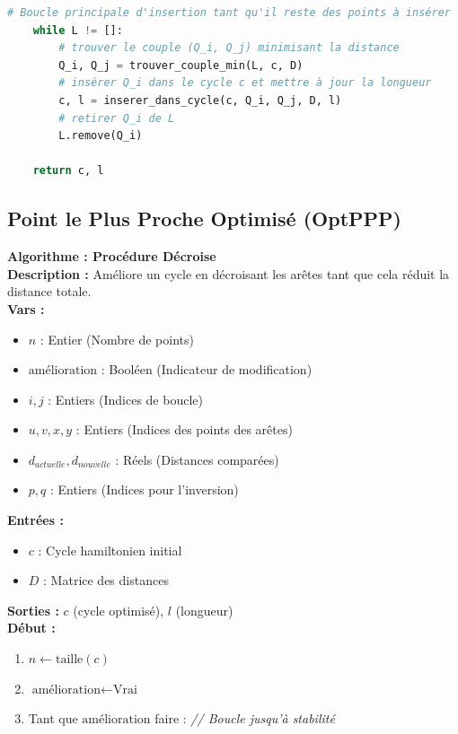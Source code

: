 \documentclass[a4paper, 12pt]{article}
\begin{document}
\begin{lstlisting}[language=Python, caption=Implémentation de PPP]
    # Boucle principale d'insertion tant qu'il reste des points à insérer
    while L != []:
        # trouver le couple (Q_i, Q_j) minimisant la distance
        Q_i, Q_j = trouver_couple_min(L, c, D)
        # insérer Q_i dans le cycle c et mettre à jour la longueur
        c, l = inserer_dans_cycle(c, Q_i, Q_j, D, l)
        # retirer Q_i de L
        L.remove(Q_i)

    return c, l
\end{lstlisting}

\subsection{Point le Plus Proche Optimisé (OptPPP)}

\begin{tcolorbox}[colback=darkWhite!75!white,colframe=black!30,left=5pt,right=5pt,top=5pt,bottom=5pt]
\textbf{Algorithme : Procédure Décroise} \\
\textbf{Description :} Améliore un cycle en décroisant les arêtes tant que cela réduit la distance totale. \\
\textbf{Vars :}
\begin{itemize}
    \item $n$ : Entier (Nombre de points)
    \item $\text{amélioration}$ : Booléen (Indicateur de modification)
    \item $i, j$ : Entiers (Indices de boucle)
    \item $u, v, x, y$ : Entiers (Indices des points des arêtes)
    \item $d_{actuelle}, d_{nouvelle}$ : Réels (Distances comparées)
    \item $p, q$ : Entiers (Indices pour l'inversion)
\end{itemize}
\textbf{Entrées :}
\begin{itemize}
    \item $c$ : Cycle hamiltonien initial
    \item $D$ : Matrice des distances
\end{itemize}
\textbf{Sorties :} $c$ (cycle optimisé), $l$ (longueur) \\
\textbf{Début :}
\begin{enumerate}
    \item $n \leftarrow \text{taille}(c)$
    \item $\text{amélioration} \leftarrow \text{Vrai}$
    \item Tant que $\text{amélioration}$ faire : \textit{// Boucle jusqu'à stabilité}

\end{enumerate}
\end{tcolorbox}
\end{document}
